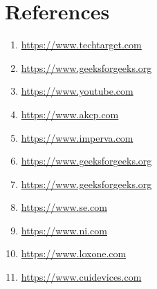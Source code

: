\documentclass[12pt]{article}
\begin{document}
\section*{References}
\begin{enumerate}

\item \href{https://www.techtarget.com/iotagenda/definition/IoT-gateway}{https://www.techtarget.com}
\item \href{https://www.geeksforgeeks.org/internet-of-things-iot-gateways/}{https://www.geeksforgeeks.org}
\item \href{https://www.youtube.com/watch?v=irq66O8NdvA}{https://www.youtube.com}
\item \href{https://www.akcp.com/blog/scaling-mqtt-network-for-better-operational-output/}{https://www.akcp.com}
\item \href{https://www.imperva.com/learn/application-security/osi-model/}{https://www.imperva.com}
\item \href{https://www.geeksforgeeks.org/layers-of-osi-model/}{https://www.geeksforgeeks.org}
\item \href{https://www.geeksforgeeks.org/ethernet-frame-format/?ref=lbp}{https://www.geeksforgeeks.org}
\item \href{https://www.se.com/us/en/faqs/FA168406/}{https://www.se.com}
\item \href{https://www.ni.com/en-in/shop/seamlessly-connect-to-third-party-devices-and-supervisory-system/the-modbus-protocol-in-depth.html}{https://www.ni.com}
\item \href{https://www.loxone.com/enus/kb/modbus-extension/}{https://www.loxone.com}
\item \href{https://www.cuidevices.com/blog/rs-485-serial-interface-explained}{https://www.cuidevices.com}

\end{enumerate}
\end{document}
